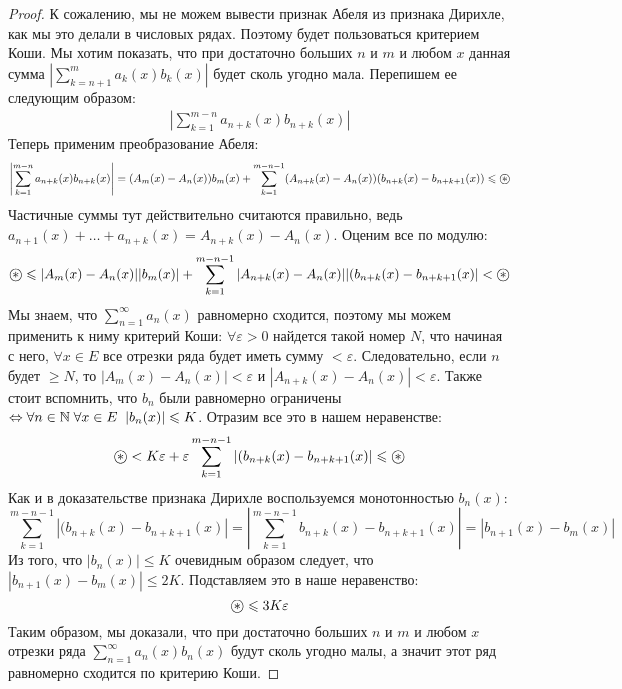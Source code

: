 \begin{proof}
    К сожалению, мы не можем вывести признак Абеля из признака Дирихле, как мы это делали в числовых рядах.
    Поэтому будет пользоваться критерием Коши. 
    Мы хотим показать, что при достаточно больших $n$ и $m$ и любом $x$ данная сумма $\left| \sum\limits_{k = n + 1}^m a_k(x)b_k(x) \right|$ будет сколь угодно мала.
    Перепишем ее следующим образом:
    \begin{gather*}
        \left| \sum\limits_{k = 1}^{m-n} a_{n+k}(x)b_{n+k}(x) \right|
    \end{gather*} 
    Теперь применим преобразование Абеля: 
    \[ \left| \sum\limits_{k = 1}^{m-n} a_{n+k}(x)b_{n+k}(x) \right| = (A_m(x) - A_n(x))b_m(x) + \sum_{k = 1}^{m - n - 1} (A_{n+k}(x) - A_n(x))(b_{n+k}(x) - b_{n+k+1}(x)) \leqslant \oast \]
    \quad Частичные суммы тут действительно считаются правильно, ведь $a_{n+1}(x) + \dots + a_{n+k}(x) = A_{n+k}(x) - A_n(x)$.
    Оценим все по модулю: \[ \oast \leqslant |A_m(x) - A_n(x)||b_m(x)| + \sum_{k = 1}^{m - n - 1} |A_{n+k}(x) - A_n(x)||(b_{n+k}(x) - b_{n+k+1}(x)| < \oast \]
    \quad Мы знаем, что $\sum\limits_{n = 1}^\infty a_n(x)$ равномерно сходится, поэтому мы можем применить к ниму критерий Коши: $\forall \varepsilon > 0$ найдется такой номер $N$, что начиная с него, $\forall x \in E$ все отрезки ряда будет иметь сумму $<\varepsilon$.
    Следовательно, если $n$ будет $\geqslant N$, то $|A_m(x) - A_n(x)| < \varepsilon$ и $|A_{n+k}(x) - A_n(x)| < \varepsilon$.
    Также стоит вспомнить, что $b_n$ были равномерно ограничены $\Leftrightarrow \forall n \in \mathbb{N} \; \forall x \in E \;\; |b_n(x)| \leqslant K$.
    Отразим все это в нашем неравенстве: \[ \oast < K\varepsilon + \varepsilon \sum_{k = 1}^{m - n - 1} |(b_{n+k}(x) - b_{n+k+1}(x)| \leqslant \oast \]
    \quad Как и в доказательстве признака Дирихле воспользуемся монотонностью $b_n(x)$:
    \[ \sum_{k = 1}^{m - n - 1} |(b_{n+k}(x) - b_{n+k+1}(x)| = \left|\sum_{k = 1}^{m - n - 1} b_{n+k}(x) - b_{n+k+1}(x) \right| = |b_{n+1}(x) - b_m(x)| \]
    \quad Из того, что $|b_n(x)| \leqslant K$ очевидным образом следует, что $|b_{n+1}(x) - b_m(x)| \leqslant 2K$. 
    Подставляем это в наше неравенство: \[ \oast \leqslant 3K\varepsilon  \]
    \quad Таким образом, мы доказали, что при достаточно больших $n$ и $m$ и любом $x$ отрезки ряда $\sum\limits_{n = 1}^\infty a_n(x)b_n(x)$ будут сколь угодно малы, а значит этот ряд равномерно сходится по критерию Коши.
\end{proof}
